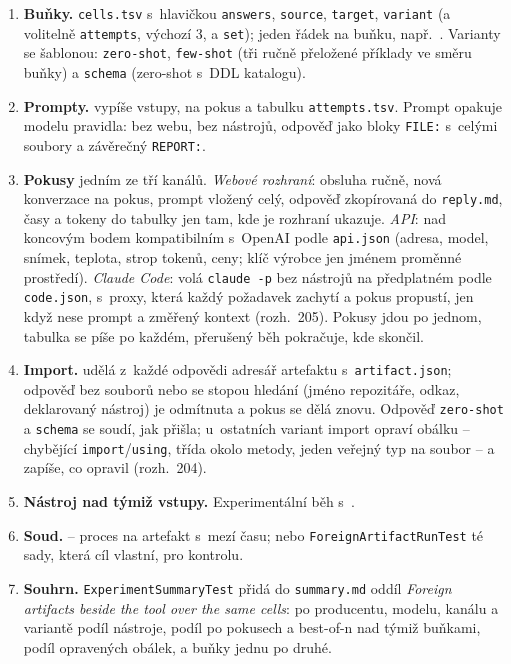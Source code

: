\documentclass{article}
\begin{document}
\begin{enumerate}[leftmargin=*,itemsep=1pt]
\item \textbf{Buňky.} \texttt{cells.tsv} s~hlavičkou \texttt{answers}, \texttt{source}, \texttt{target}, \texttt{variant} (a volitelně \texttt{attempts}, výchozí 3, a \texttt{set}); jeden řádek na buňku, např.\ . Varianty se šablonou: \texttt{zero-shot}, \texttt{few-shot} (tři ručně přeložené příklady ve směru buňky) a \texttt{schema} (zero-shot s~DDL katalogu).
\item \textbf{Prompty.}  vypíše vstupy,  na pokus a tabulku \texttt{attempts.tsv}. Prompt opakuje modelu pravidla: bez webu, bez nástrojů, odpověď jako bloky \texttt{FILE:} s~celými soubory a závěrečný \texttt{REPORT:}.
\item \textbf{Pokusy} jedním ze tří kanálů. \emph{Webové rozhraní}: obsluha ručně, nová konverzace na pokus, prompt vložený celý, odpověď zkopírovaná do \texttt{reply.md}, časy a tokeny do tabulky jen tam, kde je rozhraní ukazuje. \emph{API}:  nad koncovým bodem kompatibilním s~OpenAI podle \texttt{api.json} (adresa, model, snímek, teplota, strop tokenů, ceny; klíč výrobce jen jménem proměnné prostředí). \emph{Claude Code}:  volá \texttt{claude -p} bez nástrojů na předplatném podle \texttt{code.json}, s~proxy, která každý požadavek zachytí a pokus propustí, jen když nese prompt a změřený kontext (rozh.~205). Pokusy jdou po jednom, tabulka se píše po každém, přerušený běh pokračuje, kde skončil.
\item \textbf{Import.}  udělá z~každé odpovědi adresář artefaktu s~\texttt{artifact.json}; odpověď bez souborů nebo se stopou hledání (jméno repozitáře, odkaz, deklarovaný nástroj) je odmítnuta a pokus se dělá znovu. Odpověď \texttt{zero-shot} a \texttt{schema} se soudí, jak přišla; u~ostatních variant import opraví obálku -- chybějící \texttt{import}/\texttt{using}, třída okolo metody, jeden veřejný typ na soubor -- a zapíše, co opravil (rozh.~204).
\item \textbf{Nástroj nad týmiž vstupy.} Experimentální běh s~.
\item \textbf{Soud.}  -- proces na artefakt s~mezí času; nebo \texttt{ForeignArtifactRunTest} té sady, která cíl vlastní, pro kontrolu.
\item \textbf{Souhrn.} \texttt{ExperimentSummaryTest} přidá do \texttt{summary.md} oddíl \emph{Foreign artifacts beside the tool over the same cells}: po producentu, modelu, kanálu a variantě podíl nástroje, podíl po pokusech a best-of-n nad týmiž buňkami, podíl opravených obálek, a buňky jednu po druhé.
\end{enumerate}
\end{document}
